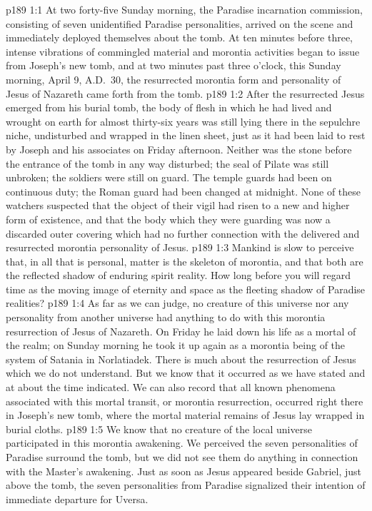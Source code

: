 \vs p189 1:1 At two forty\hyp{}five Sunday morning, the Paradise incarnation commission, consisting of seven unidentified Paradise personalities, arrived on the scene and immediately deployed themselves about the tomb. At ten minutes before three, intense vibrations of commingled material and morontia activities began to issue from Joseph’s new tomb, and at two minutes past three o’clock, this Sunday morning, April 9, A.D.~30, the resurrected morontia form and personality of Jesus of Nazareth came forth from the tomb.
\vs p189 1:2 After the resurrected Jesus emerged from his burial tomb, the body of flesh in which he had lived and wrought on earth for almost thirty\hyp{}six years was still lying there in the sepulchre niche, undisturbed and wrapped in the linen sheet, just as it had been laid to rest by Joseph and his associates on Friday afternoon. Neither was the stone before the entrance of the tomb in any way disturbed; the seal of Pilate was still unbroken; the soldiers were still on guard. The temple guards had been on continuous duty; the Roman guard had been changed at midnight. None of these watchers suspected that the object of their vigil had risen to a new and higher form of existence, and that the body which they were guarding was now a discarded outer covering which had no further connection with the delivered and resurrected morontia personality of Jesus.
\pc \vs p189 1:3 Mankind is slow to perceive that, in all that is personal, matter is the skeleton of morontia, and that both are the reflected shadow of enduring spirit reality. How long before you will regard time as the moving image of eternity and space as the fleeting shadow of Paradise realities?
\vs p189 1:4 As far as we can judge, no creature of this universe nor any personality from another universe had anything to do with this morontia resurrection of Jesus of Nazareth. On Friday he laid down his life as a mortal of the realm; on Sunday morning he took it up again as a morontia being of the system of Satania in Norlatiadek. There is much about the resurrection of Jesus which we do not understand. But we know that it occurred as we have stated and at about the time indicated. We can also record that all known phenomena associated with this mortal transit, or morontia resurrection, occurred right there in Joseph’s new tomb, where the mortal material remains of Jesus lay wrapped in burial cloths.
\vs p189 1:5 We know that no creature of the local universe participated in this morontia awakening. We perceived the seven personalities of Paradise surround the tomb, but we did not see them do anything in connection with the Master’s awakening. Just as soon as Jesus appeared beside Gabriel, just above the tomb, the seven personalities from Paradise signalized their intention of immediate departure for Uversa.
